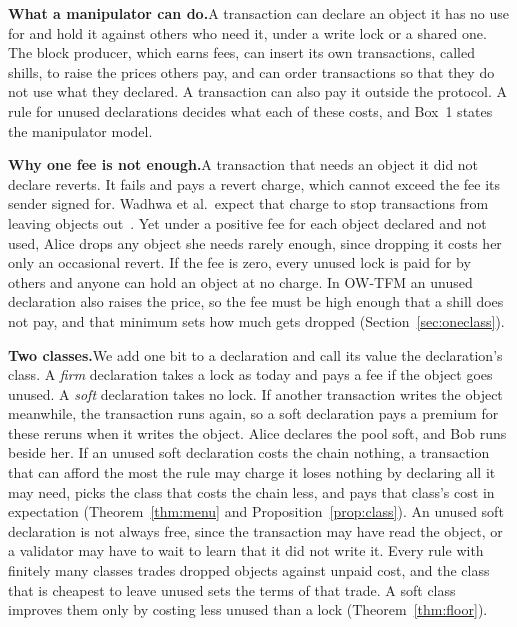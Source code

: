 \documentclass[conference,compsoc]{IEEEtran}
\numberwithin{equation}{section}
\theoremstyle{plain}
\theoremstyle{definition}
\theoremstyle{remark}
\newcommand{\runin}[1]{\par\smallskip\noindent\textbf{#1.}\enspace}
\begin{document}
\runin{What a manipulator can do}A transaction can declare an object it has no use for and hold it against others who need it, under a write lock or a shared one. The block producer, which earns fees, can insert its own transactions, called shills, to raise the prices others pay, and can order transactions so that they do not use what they declared. A transaction can also pay it outside the protocol. A rule for unused declarations decides what each of these costs, and Box~1 states the manipulator model.

\runin{Why one fee is not enough}A transaction that needs an object it did not declare reverts. It fails and pays a revert charge, which cannot exceed the fee its sender signed for. Wadhwa et al.\ expect that charge to stop transactions from leaving objects out~\cite[p.~1100]{wadhwa2026perils}. Yet under a positive fee for each object declared and not used, Alice drops any object she needs rarely enough, since dropping it costs her only an occasional revert. If the fee is zero, every unused lock is paid for by others and anyone can hold an object at no charge. In OW-TFM an unused declaration also raises the price, so the fee must be high enough that a shill does not pay, and that minimum sets how much gets dropped (Section~\ref{sec:oneclass}).

\runin{Two classes}We add one bit to a declaration and call its value the declaration's class. A \emph{firm} declaration takes a lock as today and pays a fee if the object goes unused. A \emph{soft} declaration takes no lock. If another transaction writes the object meanwhile, the transaction runs again, so a soft declaration pays a premium for these reruns when it writes the object. Alice declares the pool soft, and Bob runs beside her. If an unused soft declaration costs the chain nothing, a transaction that can afford the most the rule may charge it loses nothing by declaring all it may need, picks the class that costs the chain less, and pays that class's cost in expectation (Theorem~\ref{thm:menu} and Proposition~\ref{prop:class}). An unused soft declaration is not always free, since the transaction may have read the object, or a validator may have to wait to learn that it did not write it. Every rule with finitely many classes trades dropped objects against unpaid cost, and the class that is cheapest to leave unused sets the terms of that trade. A soft class improves them only by costing less unused than a lock (Theorem~\ref{thm:floor}).
\end{document}
